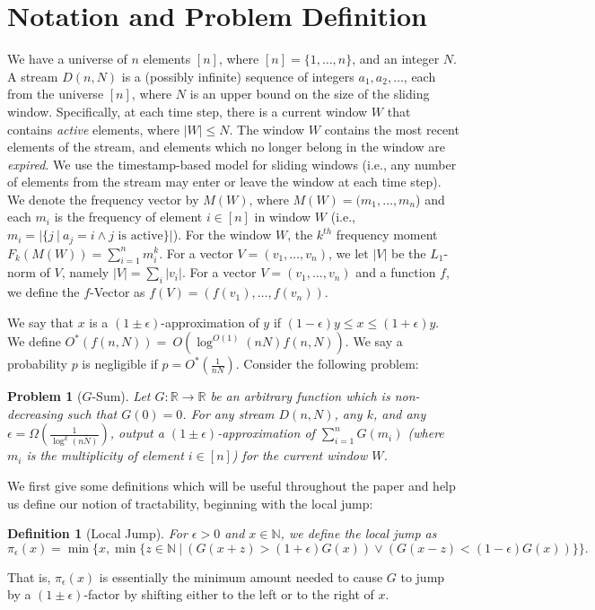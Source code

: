 \documentclass[11pt]{article}
\newtheorem{defn}{Definition}
\newtheorem{prob}{Problem}
\begin{document}
\section{Notation and Problem Definition}
\label{sec:prob}
We have a universe of $n$ elements $[n]$, where $[n] = \{1,\ldots,n\}$, and an integer $N$.
A stream $D(n,N)$ is a (possibly infinite) sequence of integers $a_1,a_2,\ldots$, each from
the universe $[n]$, where $N$ is an upper bound on the size of the sliding window.  Specifically,
at each time step, there is a current window $W$ that contains \emph{active} elements, where $|W| \leq N$.
The window $W$ contains the most recent elements of the stream,
and elements which no longer belong in the window are \emph{expired}.  We use the
timestamp-based model for sliding windows (i.e., any number of elements from the stream
may enter or leave the window at each time step).  We denote the frequency vector
by $M(W)$, where $M(W) = (m_1,\ldots,m_n$) and each $m_i$ is the frequency of element $i \in [n]$
in window $W$ (i.e., $m_i = |\{j \ | \ a_j = i \wedge j \textrm{ is active}\}|$).  For the
window $W$, the $k^{th}$ frequency moment $F_k(M(W)) = \sum_{i=1}^n m_i^k$.
For a vector $V = (v_1,\ldots,v_n)$, we let $|V|$ be the $L_1$-norm of $V$, namely
$|V| = \sum_i |v_i|$.  For a vector $V = (v_1,\ldots,v_n)$ and a function $f$, we define the
$f$-Vector as $f(V) = (f(v_1),\ldots,f(v_n))$.

We say that $x$ is a $(1 \pm \epsilon)$-approximation of $y$ if $(1 - \epsilon)y \leq x \leq (1 + \epsilon)y$.  We define $O^*(f(n,N)) =~
O(\log^{O(1)}(nN) f(n,N))$.  We say a probability $p$ is negligible if $p = O^*\left(\frac{1}{nN}\right)$.  Consider the following problem:

\begin{prob}[$G$-Sum]
Let $G : \mathbb{R} \rightarrow \mathbb{R}$ be an arbitrary function which is non-decreasing such that $G(0) = 0$.  For any stream
$D(n,N)$, any $k$, and any $\epsilon = \Omega\left(\frac{1}{\log^k(nN)}\right)$, output a $(1 \pm \epsilon)$-approximation of $\sum_{i=1}^n G(m_i)$ (where $m_i$ is the multiplicity
of element $i \in [n]$) for the current window $W$.
\end{prob}

We first give some definitions which will be useful throughout the paper and help us define our notion
of tractability, beginning with the local jump:

\begin{defn}[Local Jump]
For $\epsilon > 0$ and $x \in \mathbb{N}$, we define the local jump as
$$\pi_\epsilon(x) = \min{\{x, \min{\{z \in \mathbb{N} \ | \ (G(x + z) > (1+\epsilon)G(x)) \vee (G(x - z) < (1 - \epsilon)G(x)) \}} \}} .$$
\end{defn}
\noindent That is, $\pi_\epsilon(x)$ is essentially the minimum amount needed to cause $G$ to jump by a
$(1 \pm \epsilon)$-factor by shifting either to the left or to the right of $x$.
\end{document}
